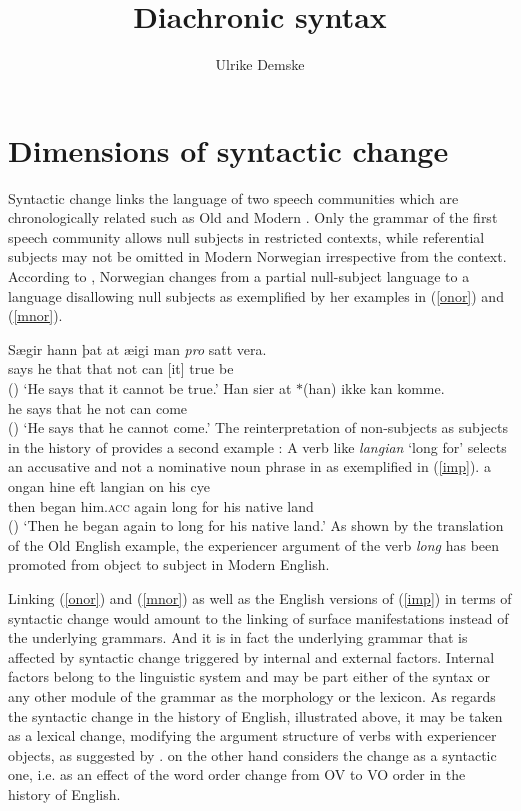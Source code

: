 \documentclass[output=paper
                ,modfonts
                ,nonflat
	        ,collection
	        ,collectionchapter
	        ,collectiontoclongg
 	        ,biblatex
                ,babelshorthands
                ,newtxmath
                ,draftmode
                ,colorlinks, citecolor=brown
]{./langsci/langscibook}
\title{Diachronic syntax}
\author{%
 Ulrike Demske\affiliation{Universität Potsdam}
}
\begin{document}
\label{chap-diachronic}
\maketitle

\section{Dimensions of syntactic change} 

Syntactic change links the language of two speech communities which are chronologically related such as Old  and Modern . Only the grammar of the first speech community allows null subjects in restricted contexts, while referential subjects may not be omitted in Modern Norwegian irrespective from the context. According to \cite{kinn2015}, Norwegian changes from a partial null-subject language to a language disallowing null subjects as exemplified by her examples in (\ref{onor}) and (\ref{mnor}).

\eal 
\ex \label{onor}
\gll Sægir hann þat  at   æigi  man \textit{pro} satt vera.\\ 
     says  he   that that not   can [it] true be \\\hfill()
\glt `He says that it cannot be true.'  
\ex \label{mnor}
\gll Han sier at $*$(han) ikke kan komme.\\ 
     he says that he not can come \\ \hfill () 
\glt `He says that he cannot come.' 
\zl
The reinterpretation of non-subjects as subjects in the history of  provides a second example \citep{denison1993}: A verb like \textit{langian} `long for' selects an accusative and not a nominative noun phrase in  as exemplified in (\ref{imp}). 
\ea \label{imp}
\gll \th a ongan hine eft langian on his cy\th \th e  \\ then began him.\textsc{acc} again long for his {native land} \\ \hfill ()
\glt `Then he began again to long for his native land.' 
\z
As shown by the translation of the Old English example, the experiencer argument of the verb \textit{long} has been promoted from object to subject in Modern English. 

Linking (\ref{onor}) and (\ref{mnor}) as well as the English versions of (\ref{imp}) in terms of syntactic change would amount to the linking of surface manifestations instead of the underlying grammars. And it is in fact the underlying grammar that is affected by syntactic change triggered by internal and external factors. Internal factors belong to the linguistic system and may be part either of the syntax or any other module of the grammar as the morphology or the lexicon. As regards the syntactic change in the history of English, illustrated above, it may be taken as a lexical change, modifying the argument structure of verbs with experiencer objects, as suggested by \cite{denison1993}. \cite{lightfoot1979} on the other hand considers the change as a syntactic one, i.e. as an effect of the word order change from OV to VO order in the history of English. 
\end{document}
